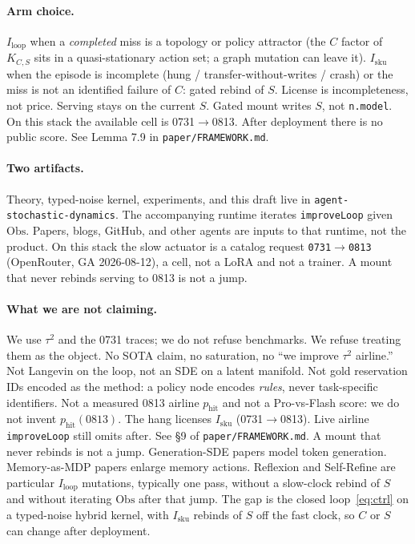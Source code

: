 \documentclass{article}
\begin{document}
\paragraph{Arm choice.}
\(I_{\mathrm{loop}}\) when a \emph{completed} miss is a topology or policy attractor (the \(C\) factor of \(K_{C,S}\) sits in a quasi-stationary action set; a graph mutation can leave it). \(I_{\mathrm{sku}}\) when the episode is incomplete (hung / transfer-without-writes / crash) or the miss is not an identified failure of \(C\): gated rebind of \(S\). License is incompleteness, not price. Serving stays on the current \(S\). Gated mount writes \(S\), not \texttt{n.model}. On this stack the available cell is 0731\(\to\)0813. After deployment there is no public score. See Lemma 7.9 in \texttt{paper/FRAMEWORK.md}.

\paragraph{Two artifacts.}
Theory, typed-noise kernel, experiments, and this draft live in \texttt{agent-stochastic-dynamics}. The accompanying runtime \citep{vdomharness} iterates \texttt{improveLoop} given \(\mathrm{Obs}\). Papers, blogs, GitHub, and other agents are inputs to that runtime, not the product. On this stack the slow actuator is a catalog request \texttt{0731}\(\to\)\texttt{0813} (OpenRouter, GA 2026-08-12), a cell, not a LoRA and not a trainer. A mount that never rebinds serving to 0813 is not a jump.

\paragraph{What we are not claiming.}
We use \(\tau^2\) and the 0731 traces; we do not refuse benchmarks. We refuse treating them as the object. No SOTA claim, no saturation, no ``we improve \(\tau^2\) airline.'' Not Langevin on the loop, not an SDE on a latent manifold. Not gold reservation IDs encoded as the method: a policy node encodes \emph{rules}, never task-specific identifiers. Not a measured 0813 airline \(p_{\mathrm{hit}}\) and not a Pro-vs-Flash score: we do not invent \(p_{\mathrm{hit}}(0813)\). The hang licenses \(I_{\mathrm{sku}}\) (0731\(\to\)0813). Live airline \texttt{improveLoop} still omits after. See \S9 of \texttt{paper/FRAMEWORK.md}. A mount that never rebinds is not a jump. Generation-SDE papers \citep{sde2408,sde2510,lgoc2605} model token generation. Memory-as-MDP papers \citep{slmv3,memcon,memento2,memp} enlarge memory actions. Reflexion and Self-Refine \citep{reflexion,selfrefine} are particular \(I_{\mathrm{loop}}\) mutations, typically one pass, without a slow-clock rebind of \(S\) and without iterating \(\mathrm{Obs}\) after that jump. The gap is the closed loop~\eqref{eq:ctrl} on a typed-noise hybrid kernel, with \(I_{\mathrm{sku}}\) rebinds of \(S\) off the fast clock, so \(C\) or \(S\) can change after deployment.
\end{document}

